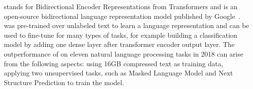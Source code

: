 

\Bert stands for Bidirectional Encoder Representations from Transformers and is an open-source bidirectional language representation model published by Google~\cite{DevlinCLT2019}. 
\Bert was pre-trained over unlabeled text to learn a language representation and can be used to fine-tune for many types of tasks, for example building a classification model by adding one dense layer after transformer encoder output layer. 
The outperformance of \Bert on eleven natural language processing tasks in 2018 can arise from the following aspects: using 16GB compressed text as training data, applying two unsupervised tasks, such as Masked Language Model and Next Structure Prediction to train the \Bert model.

